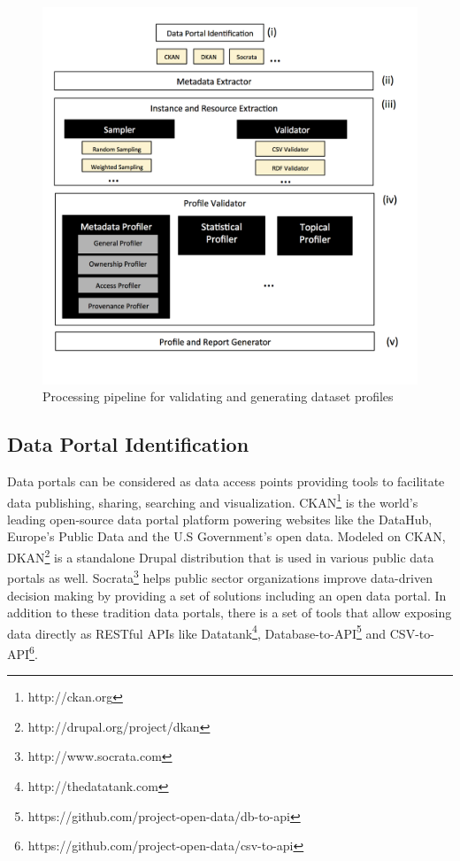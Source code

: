 \documentclass[runningheads,a4paper]{llncs}
\begin{document}
\begin{figure}[h!]
  \centering
    \includegraphics[scale=0.3]{figure-1_architecture.png}
  \caption{Processing pipeline for validating and generating dataset profiles}
\end{figure}

\subsection{Data Portal Identification}

Data portals can be considered as data access points providing tools to facilitate data publishing, sharing, searching and visualization. CKAN\footnote{http://ckan.org} is the world's leading open-source data portal platform powering websites like the DataHub, Europe's Public Data and the U.S Government's open data. Modeled on CKAN, DKAN\footnote{http://drupal.org/project/dkan} is a standalone Drupal distribution that is used in various public data portals as well. Socrata\footnote{http://www.socrata.com} helps public sector organizations improve data-driven decision making by providing a set of solutions including an open data portal. In addition to these tradition data portals, there is a set of tools that allow exposing data directly as RESTful APIs like Datatank\footnote{http://thedatatank.com}, Database-to-API\footnote{https://github.com/project-open-data/db-to-api} and CSV-to-API\footnote{https://github.com/project-open-data/csv-to-api}.\\
\end{document}
